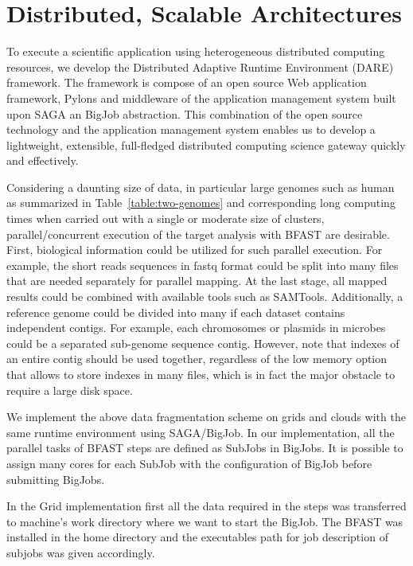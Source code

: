 \documentclass[12pt]{article}
\begin{document}
\section{Distributed, Scalable Architectures}

To execute a scientific application using heterogeneous distributed computing resources, we develop the Distributed Adaptive Runtime Environment (DARE) framework\cite{dareurl}.  The framework is compose of an open source Web application framework, Pylons
and middleware of the application management system built upon SAGA an BigJob abstraction\cite{saga-ccgrid10,saga-royalsoc,saga-web,jha2009developing,ecmls10}.  This combination of the open source technology and the application management system enables us to develop a lightweight, extensible, full-fledged distributed computing science gateway quickly and effectively\cite{pylonsurl}. 

Considering a daunting size of data, in particular large genomes such as human as summarized in Table~\ref{table:two-genomes} and corresponding long computing times when carried out with a single or moderate size of clusters, parallel/concurrent execution of the target analysis with BFAST are desirable.  First, biological information could be utilized for such parallel execution. For example, the short reads sequences in fastq format could be split into many files that are needed separately for parallel mapping.  At the last stage, all mapped results could be combined with available tools such as SAMTools\cite{samtools}.   Additionally, a reference genome could be divided into many if each dataset contains independent contigs.  For example, each chromosomes or plasmids in microbes could be a separated sub-genome sequence contig.  However, note that indexes of an entire contig should be used together, regardless of the low memory option that allows to store indexes in many files, which is in fact the major obstacle to require a large disk space.

We implement the above data fragmentation scheme on grids and clouds with the same runtime environment using SAGA/BigJob\cite{saga-royalsoc,saga-ccgrid10, ecmls10}.  In our implementation, all the parallel tasks of BFAST steps are defined as SubJobs in BigJobs.  It is possible to assign many cores for each SubJob with the configuration of BigJob before submitting BigJobs. 
  
In the Grid implementation first all the data required in the steps was transferred to machine's  work 
directory where we want to start the BigJob. The BFAST was installed in the home directory and the
executables path for job description of subjobs was given accordingly.
\end{document}
